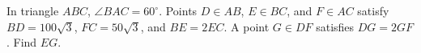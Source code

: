 In triangle $ABC$, $\angle BAC=60^\circ$. Points $D\in AB$, $E\in BC$, and $F\in AC$ satisfy $BD=100\sqrt3$, $FC=50\sqrt3$, and $BE=2EC$. A point $G\in DF$ satisfies $DG=2GF$. Find $EG$.
